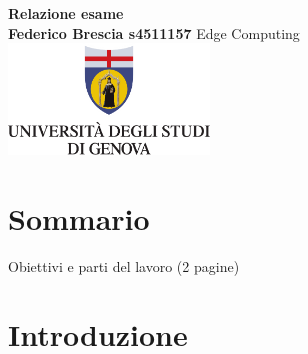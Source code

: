 \documentclass[a4paper, 10pt, oneside]{article}
\author{Federico Brescia}
\date{\today}
\begin{document}

\begin{titlepage}
    \begin{center}
        \vspace*{3cm}
        \Huge
        \textbf{Relazione esame} \\
        \vspace{1.5cm}
        \vspace{1.5cm}
        \Large
        \textbf{Federico Brescia s4511157}                      %
        \vfill
        Edge Computing\\                %
        \vspace{1cm}
        \includegraphics[width=0.4\textwidth]{Figures/logoUnige.png} \\
    \end{center}
\end{titlepage}


\newpage
\section*{Sommario}
\label{sommario}
\renewcommand{\refname}{}
Obiettivi e parti del lavoro (2 pagine)



\newpage
\tableofcontents
\newpage


\newpage
\section{Introduzione}
\label{introduzione}
\renewcommand{\refname}{}
\end{document}
